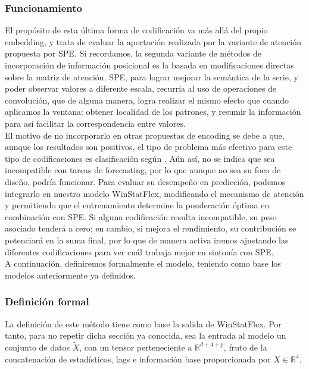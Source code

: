 \subsubsection{Funcionamiento}

El propósito de esta última forma de codificación va más allá del propio embedding, y trata de evaluar la aportación realizada por la variante de atención propuesta por SPE. Si recordamos, la segunda variante de métodos de incorporación de información posicional es la basada en modificaciones directas sobre la matriz de atención. SPE, para lograr mejorar la semántica de la serie, y poder observar valores a diferente escala, recurría al uso de operaciones de convolución, que de alguna manera, logra realizar el mismo efecto que cuando aplicamos la ventana: obtener localidad de los patrones, y resumir la información para así facilitar la correspondencia entre valores.\\

El motivo de no incorporarlo en otras propuestas de encoding se debe a que, aunque los resultados son positivos, el tipo de problema más efectivo para este tipo de codificaciones es clasificación según \cite{irani2025positionalencodingtransformerbasedtime}. Aún así, no se indica que sea incompatible con tareas de forecasting, por lo que aunque no sea su foco de diseño, podría funcionar. Para evaluar su desempeño en predicción, podemos integrarlo en nuestro modelo WinStatFlex, modificando el mecanismo de atención y permitiendo que el entrenamiento determine la ponderación óptima en combinación con SPE. Si alguna codificación resulta incompatible, su peso asociado tenderá a cero; en cambio, si mejora el rendimiento, su contribución se potenciará en la suma final, por lo que de manera activa iremos ajustando las diferentes codificaciones para ver cuál trabaja mejor en sintonía con SPE.\\

A continuación, definiremos formalmente el modelo, teniendo como base los modelos anteriormente ya definidos.


\subsubsection{Definición formal}

La definición de este método tiene como base la salida de WinStatFlex. Por tanto, para no repetir dicha sección ya conocida, sea la entrada al modelo un conjunto de datos $\tilde{X}$, con un tensor perteneciente a $\mathbb{R}^{d + 4 + p}$, fruto de la concatenación de estadísticos, lags e información base proporcionada por $X  \in \mathbb{R}^4$.

